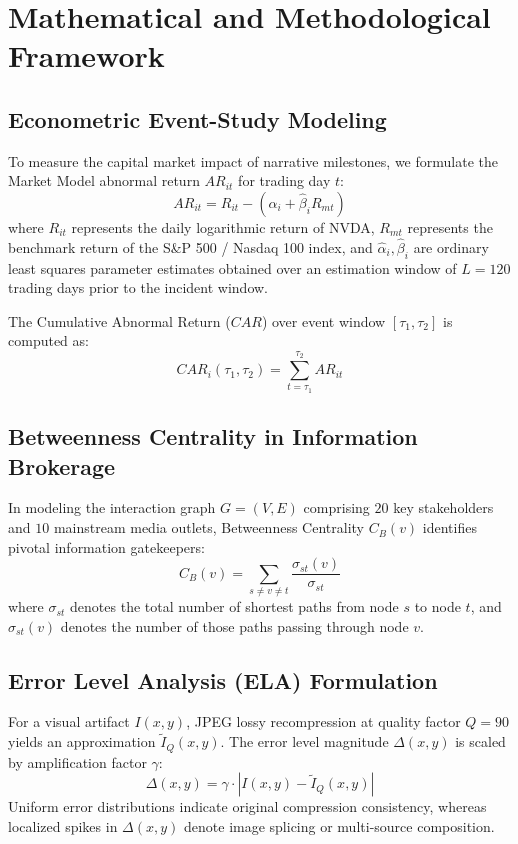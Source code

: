 \documentclass[journal,10pt,compsoc]{IEEEtran}
\begin{document}
\section{Mathematical and Methodological Framework}

\subsection{Econometric Event-Study Modeling}
To measure the capital market impact of narrative milestones, we formulate the Market Model abnormal return $AR_{it}$ for trading day $t$:
\begin{equation}
    AR_{it} = R_{it} - (\hat{\alpha}_i + \hat{\beta}_i R_{mt})
\end{equation}
where $R_{it}$ represents the daily logarithmic return of NVDA, $R_{mt}$ represents the benchmark return of the S\&P 500 / Nasdaq 100 index, and $\hat{\alpha}_i, \hat{\beta}_i$ are ordinary least squares parameter estimates obtained over an estimation window of $L = 120$ trading days prior to the incident window.

The Cumulative Abnormal Return ($CAR$) over event window $[\tau_1, \tau_2]$ is computed as:
\begin{equation}
    CAR_i(\tau_1, \tau_2) = \sum_{t=\tau_1}^{\tau_2} AR_{it}
\end{equation}

\subsection{Betweenness Centrality in Information Brokerage}
In modeling the interaction graph $G = (V, E)$ comprising $20$ key stakeholders and $10$ mainstream media outlets, Betweenness Centrality $C_B(v)$ identifies pivotal information gatekeepers:
\begin{equation}
    C_B(v) = \sum_{s \ne v \ne t} \frac{\sigma_{st}(v)}{\sigma_{st}}
\end{equation}
where $\sigma_{st}$ denotes the total number of shortest paths from node $s$ to node $t$, and $\sigma_{st}(v)$ denotes the number of those paths passing through node $v$.

\subsection{Error Level Analysis (ELA) Formulation}
For a visual artifact $I(x,y)$, JPEG lossy recompression at quality factor $Q = 90$ yields an approximation $\tilde{I}_Q(x,y)$. The error level magnitude $\Delta(x,y)$ is scaled by amplification factor $\gamma$:
\begin{equation}
    \Delta(x,y) = \gamma \cdot \left| I(x,y) - \tilde{I}_Q(x,y) \right|
\end{equation}
Uniform error distributions indicate original compression consistency, whereas localized spikes in $\Delta(x,y)$ denote image splicing or multi-source composition.
\end{document}
